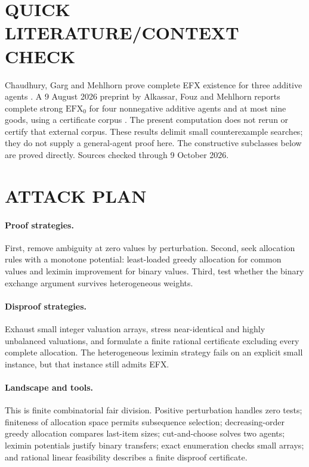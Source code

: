 \documentclass[11pt,a4paper]{article}
\theoremstyle{definition}
\theoremstyle{remark}
\begin{document}
\section{QUICK LITERATURE/CONTEXT CHECK}
Chaudhury, Garg and Mehlhorn prove complete EFX existence for three additive agents \cite{d63-three}. A 9 August 2026 preprint by Alkassar, Fouz and Mehlhorn reports complete strong $\mathrm{EFX}_0$ for four nonnegative additive agents and at most nine goods, using a certificate corpus \cite{d63-four}. The present computation does not rerun or certify that external corpus. These results delimit small counterexample searches; they do not supply a general-agent proof here. The constructive subclasses below are proved directly. Sources checked through 9 October 2026.

\section{ATTACK PLAN}
\paragraph{Proof strategies.}
First, remove ambiguity at zero values by perturbation. Second, seek allocation rules with a monotone potential: least-loaded greedy allocation for common values and leximin improvement for binary values. Third, test whether the binary exchange argument survives heterogeneous weights.

\paragraph{Disproof strategies.}
Exhaust small integer valuation arrays, stress near-identical and highly unbalanced valuations, and formulate a finite rational certificate excluding every complete allocation. The heterogeneous leximin strategy fails on an explicit small instance, but that instance still admits EFX.

\paragraph{Landscape and tools.}
This is finite combinatorial fair division. Positive perturbation handles zero tests; finiteness of allocation space permits subsequence selection; decreasing-order greedy allocation compares last-item sizes; cut-and-choose solves two agents; leximin potentials justify binary transfers; exact enumeration checks small arrays; and rational linear feasibility describes a finite disproof certificate.
\end{document}

